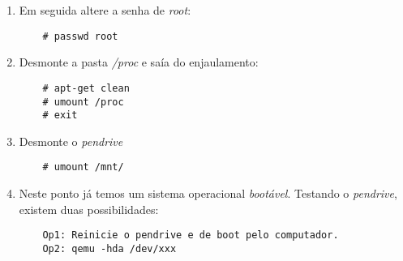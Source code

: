\documentclass[a4paper,10pt]{article}
\begin{document}
\begin{enumerate}
    \item Em seguida altere a senha de \emph{root}:
      \begin{lstlisting}
	# passwd root
      \end{lstlisting}

    \item Desmonte a pasta \emph{/proc} e saía do enjaulamento:
      \begin{lstlisting}
	# apt-get clean
	# umount /proc
	# exit
      \end{lstlisting}
    
    \item Desmonte o \emph{pendrive}
      \begin{lstlisting}
	# umount /mnt/
      \end{lstlisting}
    
     \item Neste ponto já temos um sistema operacional \emph{bootável}. Testando o \emph{pendrive}, 
	existem duas possibilidades:
      \begin{lstlisting}
	Op1: Reinicie o pendrive e de boot pelo computador.
	Op2: qemu -hda /dev/xxx
      \end{lstlisting}
  \end{enumerate}

\end{document}
